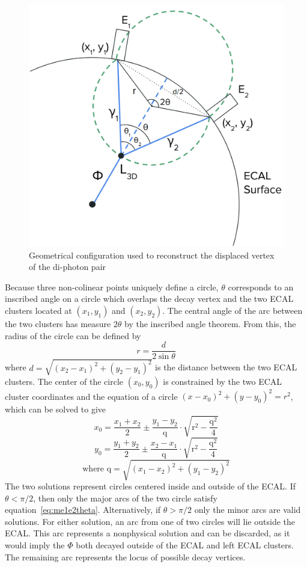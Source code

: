 \begin{figure}[htb]
	\centering
	\includegraphics[width=0.65\linewidth]{figs/05_analysis/vertexfit_diagram.png}
	\caption{Geometrical configuration used to reconstruct the displaced vertex of the di-photon pair}
	\label{fig:vertex_diagram}
\end{figure}

Because three non-colinear points uniquely define a circle, $\theta$ corresponds to an inscribed angle on a circle which overlaps the decay vertex and the two ECAL clusters located at $(x_1, y_1)$ and $(x_2, y_2)$. The central angle of the arc between the two clusters has measure $2\theta$ by the inscribed angle theorem. From this, the radius of the circle can be defined by
\begin{equation} \label{eq:vertex_r}
	r=\frac{d}{2\sin{\theta}}
\end{equation}
where $d=\sqrt{(x_2-x_1)^2+(y_2-y_1)^2}$ is the distance between the two ECAL clusters. The center of the circle $(x_0, y_0)$ is constrained by the two ECAL cluster coordinates and the equation of a circle $(x-x_0)^2+(y-y_0)^2=r^2$, which can be solved to give
\begin{equation} \label{eq:vertex_x0}
	x_0=\frac{x_1+x_2}{2}\pm\frac{y_1-y_2}{\text{q}}\cdot\sqrt{\text{r}^2-\frac{\text{q}^2}{4}}
\end{equation}
\begin{equation} \label{eq:vertex_y0}
	y_0=\frac{y_1+y_2}{2}\pm\frac{x_2-x_1}{\text{q}}\cdot\sqrt{\text{r}^2-\frac{\text{q}^2}{4}}
\end{equation}
\begin{equation} \label{eq:vertex_q}
	\text{where q}=\sqrt{(x_1-x_2)^2+(y_1-y_2)^2}
\end{equation}
The two solutions represent circles centered inside and outside of the ECAL. If $\theta<\pi/2$, then only the major arcs of the two circle satisfy equation~\ref{eq:me1e2theta}. Alternatively, if $\theta>\pi/2$ only the minor arcs are valid solutions. For either solution, an arc from one of two  circles will lie outside the ECAL. This arc represents a nonphysical solution and can be discarded, as it would imply the $\Phi$ both decayed outside of the ECAL and left ECAL clusters. The remaining arc represents the locus of possible decay vertices.

